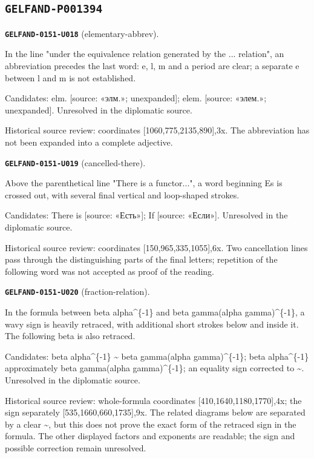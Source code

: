 \subsection*{\texttt{GELFAND-P001394}}
\par\noindent\leavevmode{}\label{GELFAND-0151-U018}\textbf{\texttt{GELFAND-0151-U018}} (elementary-abbrev).\nopagebreak[4]\par
In the line "under the equivalence relation generated by the ... relation", an abbreviation precedes the last word: e, l, m and a period are clear; a separate e between l and m is not established.\par
Candidates: elm. [source: «элм.»; unexpanded]; elem. [source: «элем.»; unexpanded]. Unresolved in the diplomatic source.\par
Historical source review: coordinates [1060,775,2135,890],3x. The abbreviation has not been expanded into a complete adjective.\par
\medskip
\par\noindent\leavevmode{}\label{GELFAND-0151-U019}\textbf{\texttt{GELFAND-0151-U019}} (cancelled-there).\nopagebreak[4]\par
Above the parenthetical line "There is a functor...", a word beginning Es is crossed out, with several final vertical and loop-shaped strokes.\par
Candidates: There is [source: «Есть»]; If [source: «Если»]. Unresolved in the diplomatic source.\par
Historical source review: coordinates [150,965,335,1055],6x. Two cancellation lines pass through the distinguishing parts of the final letters; repetition of the following word was not accepted as proof of the reading.\par
\medskip
\par\noindent\leavevmode{}\label{GELFAND-0151-U020}\textbf{\texttt{GELFAND-0151-U020}} (fraction-relation).\nopagebreak[4]\par
In the formula between beta alpha\textasciicircum{}\{-1\} and beta gamma(alpha gamma)\textasciicircum{}\{-1\}, a wavy sign is heavily retraced, with additional short strokes below and inside it. The following beta is also retraced.\par
Candidates: beta alpha\textasciicircum{}\{-1\} \textasciitilde{} beta gamma(alpha gamma)\textasciicircum{}\{-1\}; beta alpha\textasciicircum{}\{-1\} approximately beta gamma(alpha gamma)\textasciicircum{}\{-1\}; an equality sign corrected to \textasciitilde{}. Unresolved in the diplomatic source.\par
Historical source review: whole-formula coordinates [410,1640,1180,1770],4x; the sign separately [535,1660,660,1735],9x. The related diagrams below are separated by a clear \textasciitilde{}, but this does not prove the exact form of the retraced sign in the formula. The other displayed factors and exponents are readable; the sign and possible correction remain unresolved.\par
\medskip
